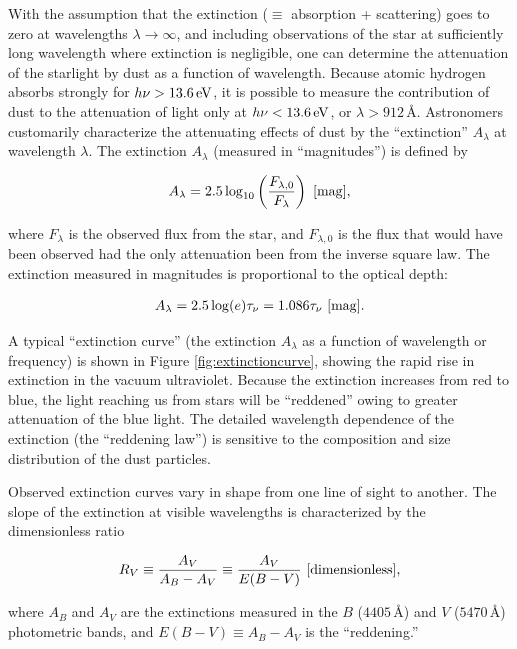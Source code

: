 \documentclass[a4paper,10pt]{article}
\begin{document}
{\noindent}With the assumption that the extinction ($\equiv$ absorption + scattering) goes to zero at wavelengths $\lambda\rightarrow\infty$, and including observations of the star at sufficiently long wavelength where extinction is negligible, one can determine the attenuation of the starlight by dust as a function of wavelength. Because atomic hydrogen absorbs strongly for $h\nu>13.6\,{\rm eV}$, it is possible to measure the contribution of dust to the attenuation of light only at $h\nu<13.6\,{\rm eV}$, or $\lambda>912$\,\AA. Astronomers customarily characterize the attenuating effects of dust by the ``extinction'' $A_\lambda$ at wavelength $\lambda$. The extinction $A_\lambda$ (measured in ``magnitudes'') is defined by

\begin{align*}
    A_\lambda = 2.5\log_{10}\left(\frac{F_{\lambda,0}}{F_\lambda}\right) ~ [{\rm mag}],
\end{align*}

{\noindent}where $F_\lambda$ is the observed flux from the star, and $F_{\lambda,0}$ is the flux that would have been observed had the only attenuation been from the inverse square law. The extinction measured in magnitudes is proportional to the optical depth:

\begin{align*}
    A_\lambda = 2.5\log(e)\tau_\nu = 1.086\tau_\nu ~ [{\rm mag}].
\end{align*}

{\noindent}A typical ``extinction curve'' (the extinction $A_\lambda$ as a function of wavelength or frequency) is shown in Figure \ref{fig:extinctioncurve}, showing the rapid rise in extinction in the vacuum ultraviolet. Because the extinction increases from red to blue, the light reaching us from stars will be ``reddened'' owing to greater attenuation of the blue light. The detailed wavelength dependence of the extinction (the ``reddening law'') is sensitive to the composition and size distribution of the dust particles. 

{\noindent}Observed extinction curves vary in shape from one line of sight to another. The slope of the extinction at visible wavelengths is characterized by the dimensionless ratio

\begin{align*}
    R_V \equiv \frac{A_V}{A_B-A_V} \equiv \frac{A_V}{E(B-V)} ~ [{\rm dimensionless}],
\end{align*}

{\noindent}where $A_B$ and $A_V$ are the extinctions measured in the $B$ ($4405$\,\AA) and $V$ ($5470$\,\AA) photometric bands, and $E(B-V)\equiv A_B-A_V$ is the ``reddening.''
\end{document}

